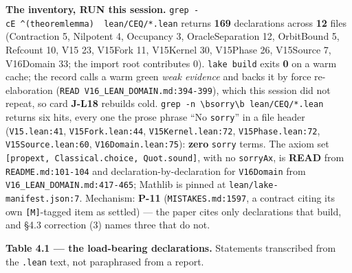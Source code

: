 \documentclass[11pt,a4paper]{article}
\theoremstyle{plain}
\theoremstyle{definition}
\theoremstyle{remark}
\begin{document}
\textbf{The inventory, RUN this session.}
\texttt{grep\ -cE\ \textquotesingle{}\^{}(theorem\textbar{}lemma)\ \textquotesingle{}\ lean/CEQ/*.lean}
returns \textbf{169} declarations across \textbf{12} files (Contraction
5, Nilpotent 4, Occupancy 3, OracleSeparation 12, OrbitBound 5, Refcount
10, V15 23, V15Fork 11, V15Kernel 30, V15Phase 26, V15Source 7,
V16Domain 33; the import root contributes 0). \texttt{lake\ build} exits
\textbf{0} on a warm cache; the record calls a warm green \emph{weak
evidence} and backs it by force re-elaboration
(\texttt{READ\ V16\_LEAN\_DOMAIN.md:394-399}), which this session did
not repeat, so card \textbf{J-L18} rebuilds cold.
\texttt{grep\ -n\ \textquotesingle{}\textbackslash{}bsorry\textbackslash{}b\textquotesingle{}\ lean/CEQ/*.lean}
returns six hits, every one the prose phrase ``No \texttt{sorry}'' in a
file header (\texttt{V15.lean:41}, \texttt{V15Fork.lean:44},
\texttt{V15Kernel.lean:72}, \texttt{V15Phase.lean:72},
\texttt{V15Source.lean:60}, \texttt{V16Domain.lean:75}): \textbf{zero}
\texttt{sorry} terms. The axiom set
\texttt{{[}propext,\ Classical.choice,\ Quot.sound{]}}, with no
\texttt{sorryAx}, is \textbf{READ} from \texttt{README.md:101-104} and
declaration-by-declaration for \texttt{V16Domain} from
\texttt{V16\_LEAN\_DOMAIN.md:417-465}; Mathlib is pinned at
\texttt{lean/lake-manifest.json:7}. Mechanism: \textbf{P-11}
(\texttt{MISTAKES.md:1597}, a contract citing its own
\texttt{{[}M{]}}-tagged item as settled) --- the paper cites only
declarations that build, and §4.3 correction (3) names three that do
not.

\textbf{Table 4.1 --- the load-bearing declarations.} Statements
transcribed from the \texttt{.lean} text, not paraphrased from a report.
\end{document}
